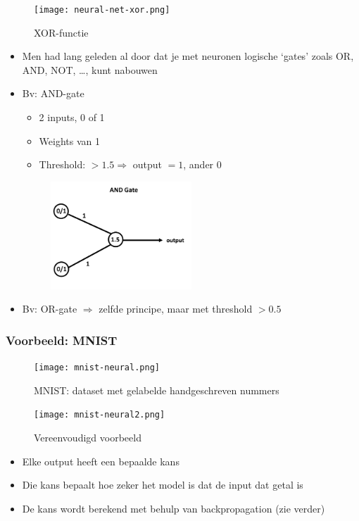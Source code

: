 \documentclass{article}
\begin{document}
\begin{figure}[H]
    \centering
    \texttt{[image: neural-net-xor.png]}
    \caption{XOR-functie}
\end{figure}

\begin{itemize}
    \item Men had lang geleden al door dat je met neuronen logische `gates' zoals OR, AND, NOT, \dots, kunt nabouwen
    \item Bv: AND-gate
    \begin{itemize}
        \item 2 inputs, 0 of 1
        \item Weights van 1
        \item Threshold: $>1.5 \Rightarrow$ output $=1$, ander $0$ 
    \end{itemize}
    \begin{figure}[H]
        \centering
        \includegraphics[width=0.5\textwidth]{and-gate.png}
    \end{figure}
    \item Bv: OR-gate $\Rightarrow$ zelfde principe, maar met threshold $> 0.5$ 
\end{itemize}

\subsubsection{Voorbeeld: MNIST}

\begin{figure}[H]
    \centering
    \texttt{[image: mnist-neural.png]}
    \caption{MNIST: dataset met gelabelde handgeschreven nummers}
\end{figure}

\begin{figure}[H]
    \centering
    \texttt{[image: mnist-neural2.png]}
    \caption{Vereenvoudigd voorbeeld}
\end{figure}

\begin{itemize}
    \item Elke output heeft een bepaalde kans
    \item Die kans bepaalt hoe zeker het model is dat de input dat getal is
    \item De kans wordt berekend met behulp van backpropagation (zie verder)
\end{itemize}
\end{document}
